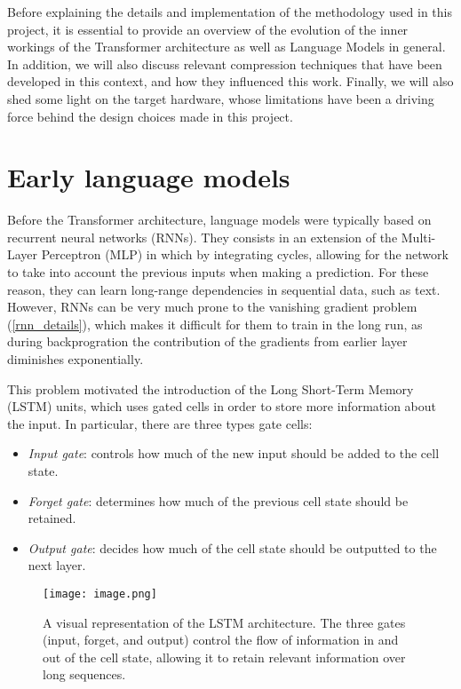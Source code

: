 Before explaining the details and implementation of the methodology used in this project, it is essential to provide an overview of the evolution of the inner workings of the Transformer architecture as well as Language Models in general. In addition, we will also discuss relevant compression techniques that have been developed in this context, and how they influenced this work.
Finally, we will also shed some light on the target hardware, whose limitations have been a driving force behind the design choices made in this project.

\section{Early language models}
Before the Transformer architecture, language models were typically based on recurrent neural networks (RNNs). They consists in an extension of the Multi-Layer Perceptron (MLP) in which by integrating cycles, allowing for the network to take into account the previous inputs when making a prediction. For these reason, they can learn long-range dependencies in sequential data, such as text. However, RNNs can be very much prone to the vanishing gradient problem (\ref{rnn_details}), which makes it difficult for them to train in the long run, as during backprogration the contribution of the gradients from earlier layer diminishes exponentially. 

This problem motivated the introduction of the Long Short-Term Memory (LSTM) units, which uses gated cells in order to store more information about the input. In particular, there are three types gate cells:
\begin{itemize}
    \item \textit{Input gate}: controls how much of the new input should be added to the cell state.
    \item \textit{Forget gate}: determines how much of the previous cell state should be retained.
    \item \textit{Output gate}: decides how much of the cell state should be outputted to the next layer.
\end{itemize}
\begin{figure}[!htbp]
    \centering
    \texttt{[image: image.png]}
    \caption{A visual representation of the LSTM architecture. The three gates (input, forget, and output) control the flow of information in and out of the cell state, allowing it to retain relevant information over long sequences.}
    \label{fig:your-label}
\end{figure}


